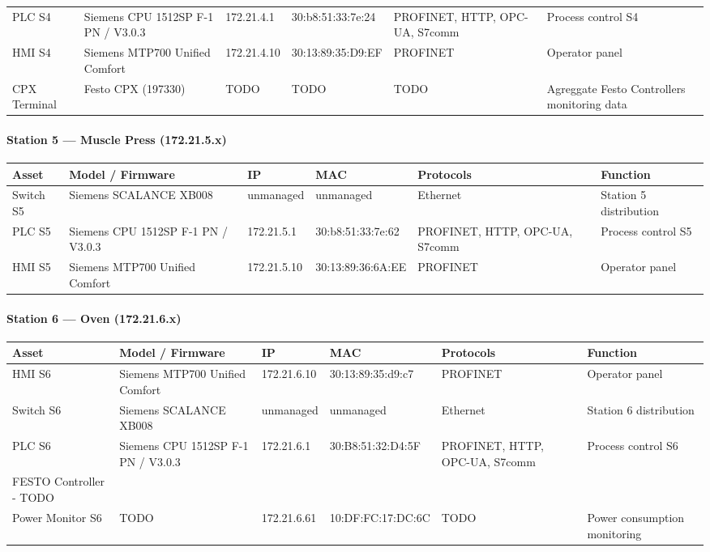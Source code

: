 {\begin{longtable}{L{2cm} L{2.1cm} L{2.1cm} L{2.6cm} L{2.4cm} L{4cm}}
    PLC S4 & Siemens CPU 1512SP F-1 PN / V3.0.3 & 172.21.4.1 & 30:b8:51:33:7e:24 &
    PROFINET, HTTP, OPC-UA, S7comm & Process control S4 \\

    HMI S4 & Siemens MTP700 Unified Comfort & 172.21.4.10 & 30:13:89:35:D9:EF &
    PROFINET & Operator panel \\

    CPX Terminal & Festo CPX (197330) & TODO & TODO & TODO & Agreggate Festo Controllers monitoring data \\
\bottomrule
\end{longtable}

\paragraph{Station 5 --- Muscle Press (172.21.5.x)}
\begin{longtable}{L{2cm} L{2.1cm} L{2.1cm} L{2.6cm} L{2.4cm} L{4cm}}
\toprule
\textbf{Asset} & \textbf{Model / Firmware} & \textbf{IP} & \textbf{MAC} & \textbf{Protocols} & \textbf{Function} \\
\midrule \endhead
    Switch S5 & Siemens SCALANCE XB008 & unmanaged & unmanaged & Ethernet &
    Station 5 distribution \\

    PLC S5 & Siemens CPU 1512SP F-1 PN / V3.0.3 & 172.21.5.1 & 30:b8:51:33:7e:62 &
    PROFINET, HTTP, OPC-UA, S7comm & Process control S5 \\

    HMI S5 & Siemens MTP700 Unified Comfort & 172.21.5.10 & 30:13:89:36:6A:EE &
    PROFINET & Operator panel \\

\bottomrule
\end{longtable}

\paragraph{Station 6 --- Oven (172.21.6.x)}
\begin{longtable}{L{2cm} L{2.1cm} L{2.1cm} L{2.6cm} L{2.4cm} L{4cm}}
\toprule
\textbf{Asset} & \textbf{Model / Firmware} & \textbf{IP} & \textbf{MAC} & \textbf{Protocols} & \textbf{Function} \\
\midrule \endhead
HMI S6 & Siemens MTP700 Unified Comfort & 172.21.6.10 & 30:13:89:35:d9:c7 & PROFINET & Operator panel \\

Switch S6 & Siemens SCALANCE XB008 & unmanaged & unmanaged & Ethernet & Station 6 distribution \\

PLC S6 & Siemens CPU 1512SP F-1 PN / V3.0.3 & 172.21.6.1 & 30:B8:51:32:D4:5F & PROFINET, HTTP, OPC-UA, S7comm & Process control S6 \\

FESTO Controller - TODO\\

Power Monitor S6 & TODO & 172.21.6.61 & 10:DF:FC:17:DC:6C & TODO & Power consumption monitoring \\
\bottomrule
\end{longtable}
} %